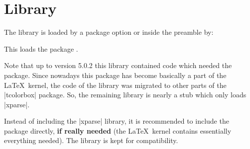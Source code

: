 \clearpage
\section{Library }\label{sec:xparse}%
%
The library is loaded by a package option or inside the preamble by:
\begin{dispListing}
\end{dispListing}
This loads the package  \cite{latexproject:xparse}.

Note that up to version 5.0.2 this library contained code which
needed the  package. Since nowadays this package has become
basically a part of the \LaTeX\ kernel, the code of the library was
migrated to other parts of the |tcolorbox| package. So, the remaining
library is nearly a stub which only loads |xparse|.

Instead of including the |xparse| library, it is recommended to include the
 package directly, \textbf{if really needed} (the \LaTeX\ kernel contains
essentially everything needed). The library is kept for compatibility.
